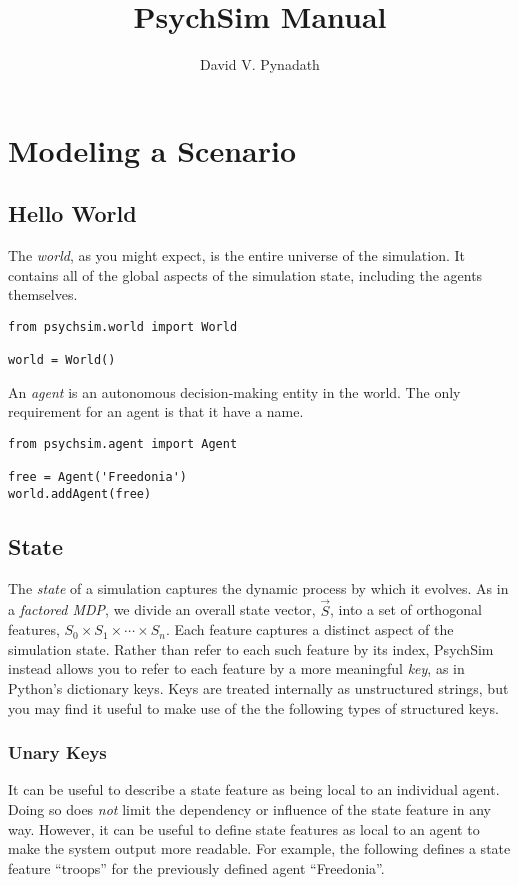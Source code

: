 \documentclass{book}
\title{PsychSim Manual}
\author{David V. Pynadath}
\begin{document}
\maketitle
\chapter{Modeling a Scenario}

\section{Hello World}
The {\em world}, as you might expect, is the entire universe of the simulation. It contains all of the global aspects of the simulation state, including the agents themselves.

\begin{verbatim}
from psychsim.world import World

world = World()
\end{verbatim}

An {\em agent} is an autonomous decision-making entity in the world. The only requirement for an agent is that it have a name.

\begin{verbatim}
from psychsim.agent import Agent

free = Agent('Freedonia')
world.addAgent(free)
\end{verbatim}

\section{State}
The {\em state} of a simulation captures the dynamic process by which it evolves. As in a {\em factored MDP}, we divide an overall state vector, $\vec S$, into a set of orthogonal features, $S_0\times S_1\times\cdots\times S_n$. Each feature captures a distinct aspect of the simulation state. Rather than refer to each such feature by its index, PsychSim instead allows you to refer to each feature by a more meaningful {\em key}, as in Python's dictionary keys. Keys are treated internally as unstructured strings, but you may find it useful to make use of the the following types of structured keys.

\subsection{Unary Keys}
It can be useful to describe a state feature as being local to an individual agent. Doing so does {\em not} limit the dependency or influence of the state feature in any way. However, it can be useful to define state features as local to an agent to make the system output more readable. For example, the following defines a state feature ``troops'' for the previously defined agent ``Freedonia''.
\end{document}
